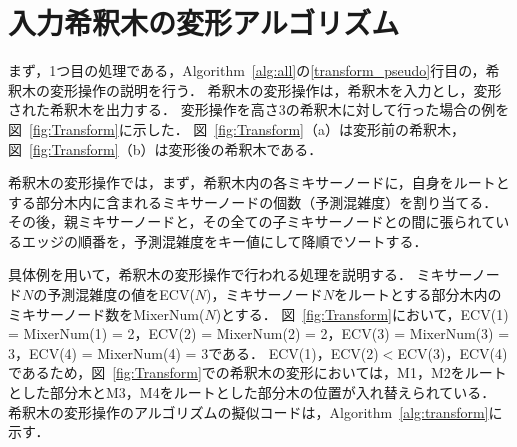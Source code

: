 \section{入力希釈木の変形アルゴリズム}
まず，1つ目の処理である，Algorithm~\ref{alg:all}の\ref{transform_pseudo}行目の，希釈木の変形操作の説明を行う． 希釈木の変形操作は，希釈木を入力とし，変形された希釈木を出力する． 変形操作を高さ3の希釈木に対して行った場合の例を図~\ref{fig:Transform}に示した．
図~\ref{fig:Transform}（a）は変形前の希釈木，図~\ref{fig:Transform}（b）は変形後の希釈木である．

希釈木の変形操作では，まず，希釈木内の各ミキサーノードに，自身をルートとする部分木内に含まれるミキサーノードの個数（予測混雑度）を割り当てる．
その後，親ミキサーノードと，その全ての子ミキサーノードとの間に張られているエッジの順番を，予測混雑度をキー値にして降順でソートする． 

具体例を用いて，希釈木の変形操作で行われる処理を説明する．
ミキサーノード$N$の予測混雑度の値をECV($N$)，ミキサーノード$N$をルートとする部分木内のミキサーノード数をMixerNum($\mathit{N}$)とする．
図~\ref{fig:Transform}において，ECV(1) = MixerNum(1) = 2，ECV(2) = MixerNum(2) = 2，ECV(3) = MixerNum(3) = 3，ECV(4) = MixerNum(4) = 3である．
ECV(1)，ECV(2)$<$ECV(3)，ECV(4)であるため，図~\ref{fig:Transform}での希釈木の変形においては，M1，M2をルートとした部分木とM3，M4をルートとした部分木の位置が入れ替えられている．
希釈木の変形操作のアルゴリズムの擬似コードは，Algorithm~\ref{alg:transform}に示す．




